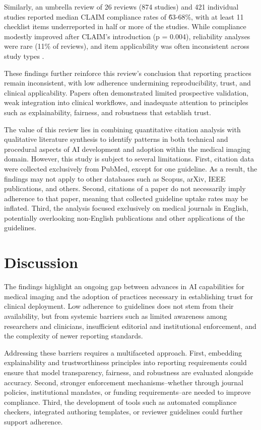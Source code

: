 \documentclass{article}
\begin{document}
Similarly, an umbrella review of 26 reviews (874 studies) and 421 individual studies reported median CLAIM compliance rates of \~63-68\%, with at least 11 checklist items underreported in half or more of the studies. While compliance modestly improved after CLAIM’s introduction (p = 0.004), reliability analyses were rare (11\% of reviews), and item applicability was often inconsistent across study types \cite{burakkoak_2025_adherence}.

These findings further reinforce this review’s conclusion that reporting practices remain inconsistent, with low adherence undermining reproducibility, trust, and clinical applicability. Papers often demonstrated limited prospective validation, weak integration into clinical workflows, and inadequate attention to principles such as explainability, fairness, and robustness that establish trust.

The value of this review lies in combining quantitative citation analysis with qualitative literature synthesis to identify patterns in both technical and procedural aspects of AI development and adoption within the medical imaging domain. However, this study is subject to several limitations. First, citation data were collected exclusively from PubMed, except for one guideline. As a result, the findings may not apply to other databases such as Scopus, arXiv, IEEE publications, and others. Second, citations of a paper do not necessarily imply adherence to that paper, meaning that collected guideline uptake rates may be inflated. Third, the analysis focused exclusively on medical journals in English, potentially overlooking non-English publications and other applications of the guidelines.

\section{Discussion}
The findings highlight an ongoing gap between advances in AI capabilities for medical imaging and the adoption of practices necessary in establishing trust for clinical deployment. Low adherence to guidelines does not stem from their availability, but from systemic barriers such as limited awareness among researchers and clinicians, insufficient editorial and institutional enforcement, and the complexity of newer reporting standards.

Addressing these barriers requires a multifaceted approach. First, embedding explainability and trustworthiness principles into reporting requirements could ensure that model transparency, fairness, and robustness are evaluated alongside accuracy. Second, stronger enforcement mechanisms–whether through journal policies, institutional mandates, or funding requirements–are needed to improve compliance. Third, the development of tools such as automated compliance checkers, integrated authoring templates, or reviewer guidelines could further support adherence.
\end{document}

